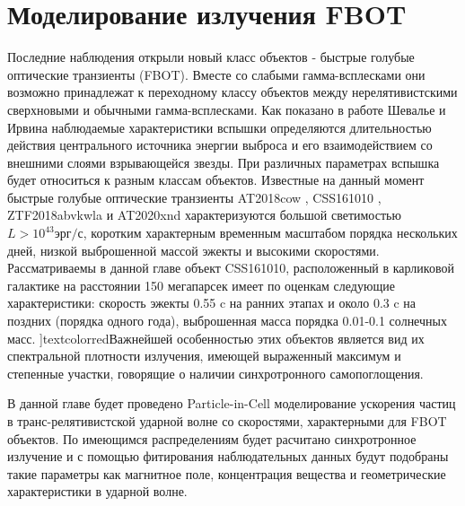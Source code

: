 \chapter{Моделирование излучения FBOT}\label{FBOT}

Последние наблюдения открыли новый класс объектов - быстрые голубые оптические транзиенты (FBOT)\cite{Drout2014, Margutti2014, Coppejans2020, Ho2020}. Вместе со слабыми гамма-всплесками они возможно принадлежат к переходному классу объектов между нерелятивистскими сверхновыми и обычными гамма-всплесками. Как показано в работе Шевалье и Ирвина \cite{Chevalier2011} наблюдаемые характеристики вспышки определяются длительностью действия центрального источника энергии выброса и его взаимодействием со внешними слоями взрывающейся звезды. При различных параметрах вспышка будет относиться к разным классам объектов. Известные на данный момент быстрые голубые оптические транзиенты AT2018cow \cite{Margutti2014}, CSS161010 \cite{Coppejans2020}, ZTF2018abvkwla \cite{Ho2020} и AT2020xnd \cite{Ho2021, Bright2021} характеризуются большой светимостью $L > 10^43 эрг/с$, коротким характерным временным масштабом порядка нескольких дней, низкой выброшенной массой эжекты и высокими скоростями.
Рассматриваемы в данной главе объект CSS161010, расположенный в карликовой галактике на расстоянии 150 мегапарсек имеет по оценкам следующие\cite{Coppejans2020} характеристики: скорость эжекты 0.55 c на ранних этапах и около 0.3 c на поздних (порядка одного года), выброшенная масса порядка 0.01-0.1 солнечных масс. ]textcolor{red}{Важнейшей особенностью этих объектов является вид их спектральной плотности излучения, имеющей выраженный максимум и степенные участки, говорящие о наличии синхротронного самопоглощения.}


В данной главе будет проведено Particle-in-Cell моделирование ускорения частиц в транс-релятивистской ударной волне со скоростями, характерными для FBOT объектов. По имеющимся распределениям будет расчитано синхротронное излучение и с помощью фитирования наблюдательных данных будут подобраны такие параметры как магнитное поле, концентрация вещества и геометрические характеристики в ударной волне.

